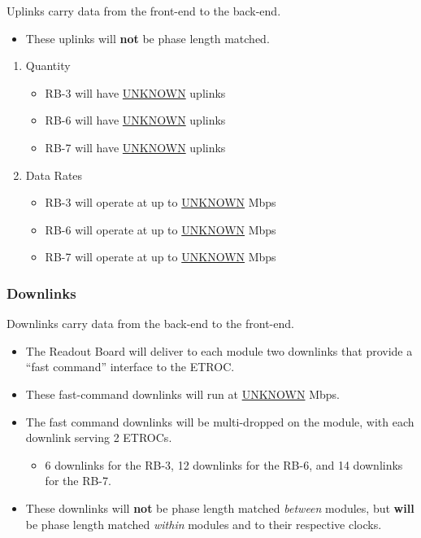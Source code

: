\documentclass[11pt]{article}
\begin{document}
Uplinks carry data from the front-end to the back-end.

\begin{itemize}
\item These uplinks will \textbf{not} be phase length matched.
\end{itemize}

\begin{enumerate}
\item Quantity
\label{sec:orgab87c7d}
\begin{itemize}
\item RB-3 will have \uline{UNKNOWN} uplinks
\item RB-6 will have \uline{UNKNOWN} uplinks
\item RB-7 will have \uline{UNKNOWN} uplinks
\end{itemize}
\item Data Rates
\label{sec:org33f4050}
\begin{itemize}
\item RB-3 will operate at up to \uline{UNKNOWN} Mbps
\item RB-6 will operate at up to \uline{UNKNOWN} Mbps
\item RB-7 will operate at up to \uline{UNKNOWN} Mbps
\end{itemize}
\end{enumerate}
\subsubsection{Downlinks}
\label{sec:orgfff7163}

Downlinks carry data from the back-end to the front-end.

\begin{itemize}
\item The Readout Board will deliver to each module two downlinks that provide a ``fast command'' interface to the ETROC.
\item These fast-command downlinks will run at \uline{UNKNOWN} Mbps.
\item The fast command downlinks will be multi-dropped on the module, with each downlink serving 2 ETROCs.
\begin{itemize}
\item 6 downlinks for the RB-3, 12 downlinks for the RB-6, and 14 downlinks for the RB-7.
\end{itemize}
\item These downlinks will \textbf{not} be phase length matched \emph{between} modules, but \textbf{will} be phase length matched \emph{within} modules and to their respective clocks.
\end{itemize}
\end{document}

